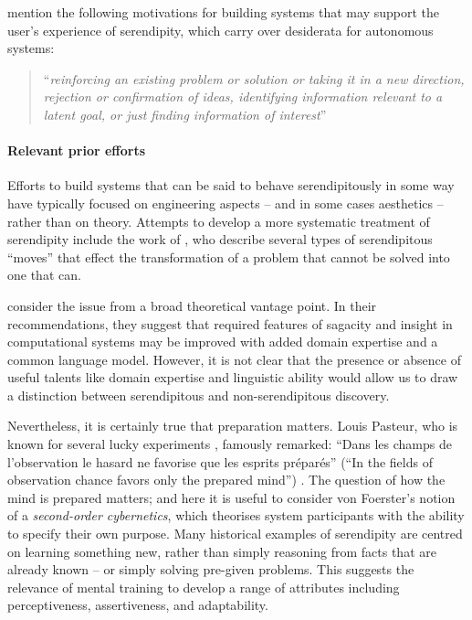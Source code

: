 \citet{Andre:2009:XSP:1518701.1519009} mention the following
motivations for building systems that may support the user's experience of serendipity, which carry over desiderata for autonomous systems:
\begin{quote}
``\emph{reinforcing an existing problem or solution or taking it
in a new direction, rejection or confirmation of ideas,
identifying information relevant to a latent goal, or just finding
information of interest}''
\end{quote}

\paragraph{Relevant prior efforts}
Efforts to build systems that can be said to behave
serendipitously in some way have typically focused on engineering aspects \cite{wilkins1985recovering,washington1999autonomous,muscettola1997board} -- and in
some cases aesthetics \cite{cybernetic-serendipity} -- rather than on
theory.  Attempts to develop a more systematic treatment of
serendipity include the work of \citet{Figueiredo2001}, who describe
several types of serendipitous ``moves'' that effect the
transformation of a problem that cannot be solved into one that can.

\citet{andre2009discovery} consider the issue from a broad theoretical vantage point.  In their recommendations, they suggest that required features of sagacity and insight in
computational systems may be improved with added domain expertise and
a common language model.  However, it is not clear that the
presence or absence of useful talents like domain expertise and linguistic
ability would allow us to draw a distinction between serendipitous and
non-serendipitous discovery.

Nevertheless, it is certainly true that preparation matters.
Louis Pasteur, who is known for
several lucky experiments \cite{roberts,gaughan2010accidental},
famously remarked: ``Dans les champs de l'observation le hasard ne
favorise que les esprits pr\'epar\'es'' (``In the fields of
observation chance favors only the prepared mind'')
\cite[p.~131]{pasteur-chance}.  The question of how the mind is prepared matters; and here it is useful to consider von Foerster's \cite{von2003cybernetics} notion of a
\emph{second-order cybernetics}, which theorises system participants with the ability to specify their own purpose.
Many historical examples of
serendipity are centred on learning something new, rather than
simply reasoning from facts that are already known -- or simply solving pre-given problems.  This suggests the relevance of mental training to develop a range of attributes including perceptiveness, assertiveness, and adaptability.

